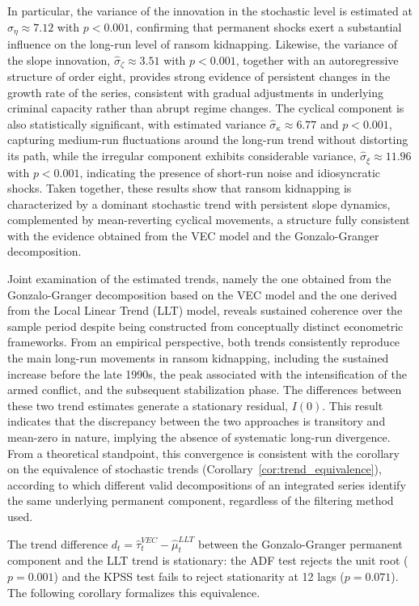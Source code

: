 \documentclass[12pt,a4paper]{article}
\theoremstyle{plain}
\theoremstyle{definition}
\theoremstyle{remark}
\newcommand{\1}{\mathbf{1}}
\begin{document}
In particular, the variance of the innovation in the stochastic level is estimated at
$\hat{\sigma}_{\eta}\approx 7.12$ with $p<0.001$, confirming that permanent shocks
exert a substantial influence on the long-run level of ransom kidnapping. Likewise,
the variance of the slope innovation, $\hat{\sigma}_{\zeta}\approx 3.51$ with
$p<0.001$, together with an autoregressive structure of order eight, provides strong
evidence of persistent changes in the growth rate of the series, consistent with
gradual adjustments in underlying criminal capacity rather than abrupt regime changes.
The cyclical component is also statistically significant, with estimated variance
$\hat{\sigma}_{\kappa}\approx 6.77$ and $p<0.001$, capturing medium-run fluctuations
around the long-run trend without distorting its path, while the irregular component
exhibits considerable variance, $\hat{\sigma}_{\xi}\approx 11.96$ with $p<0.001$,
indicating the presence of short-run noise and idiosyncratic shocks. Taken together,
these results show that ransom kidnapping is characterized by a dominant stochastic
trend with persistent slope dynamics, complemented by mean-reverting cyclical
movements, a structure fully consistent with the evidence obtained from the VEC model
and the Gonzalo-Granger decomposition.

Joint examination of the estimated trends, namely the one obtained from the
Gonzalo-Granger decomposition based on the VEC model and the one derived from the
Local Linear Trend (LLT) model, reveals sustained coherence over the sample period
despite being constructed from conceptually distinct econometric frameworks. From an
empirical perspective, both trends consistently reproduce the main long-run movements
in ransom kidnapping, including the sustained increase before the late 1990s, the peak
associated with the intensification of the armed conflict, and the subsequent
stabilization phase. The differences between these two trend estimates generate a
stationary residual, $I(0)$. This result indicates that the discrepancy between the two
approaches is transitory and mean-zero in nature, implying the absence of systematic
long-run divergence. From a theoretical standpoint, this convergence is consistent with
the corollary on the equivalence of stochastic trends (Corollary~\ref{cor:trend_equivalence}),
according to which different valid decompositions of an integrated series identify the
same underlying permanent component, regardless of the filtering method used.

The trend difference $d_t=\hat{\tau}_t^{VEC}-\hat{\mu}_t^{LLT}$ between the
Gonzalo-Granger permanent component and the LLT trend is stationary: the ADF test
rejects the unit root ($p=0.001$) and the KPSS test fails to reject stationarity at
12 lags ($p=0.071$). The following corollary formalizes this equivalence.
\end{document}
